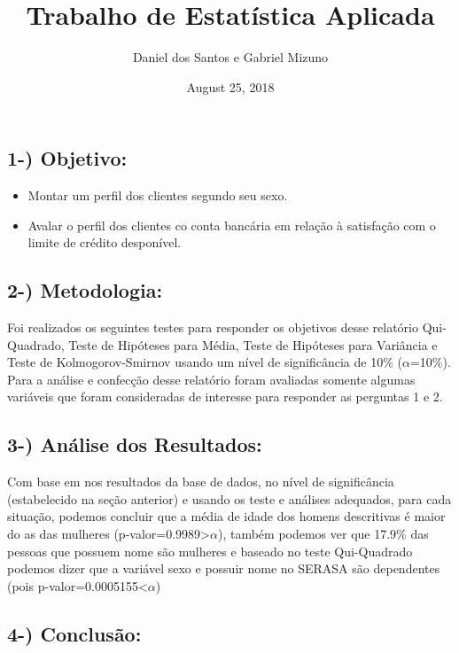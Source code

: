 \documentclass[]{article}
\title{Trabalho de Estatística Aplicada}
\author{Daniel dos Santos e Gabriel Mizuno}
\date{August 25, 2018}
\providecommand{\tightlist}{%
  \setlength{\itemsep}{0pt}\setlength{\parskip}{0pt}}
\begin{document}
\maketitle

{
\setcounter{tocdepth}{1}
\tableofcontents
}
\subsection{1-) Objetivo:}\label{objetivo}

\begin{itemize}
\tightlist
\item
  Montar um perfil dos clientes segundo seu sexo.\\
\item
  Avalar o perfil dos clientes co conta bancária em relação à satisfação
  com o limite de crédito desponível.
\end{itemize}

\subsection{2-) Metodologia:}\label{metodologia}

Foi realizados os seguintes testes para responder os objetivos desse
relatório Qui-Quadrado, Teste de Hipóteses para Média, Teste de
Hipóteses para Variância e Teste de Kolmogorov-Smirnov usando um nível
de significância de 10\% (\(\alpha\)=10\%). Para a análise e confecção
desse relatório foram avaliadas somente algumas variáveis que foram
consideradas de interesse para responder as perguntas 1 e 2.

\subsection{3-) Análise dos Resultados:}\label{analise-dos-resultados}

Com base em nos resultados da base de dados, no nível de significância
(estabelecido na seção anterior) e usando os teste e análises adequados,
para cada situação, podemos concluir que a média de idade dos homens
descritivas é maior do as das mulheres
(p-valor=0.9989\textgreater{}\(\alpha\)), também podemos ver que 17.9\%
das pessoas que possuem nome são mulheres e baseado no teste
Qui-Quadrado podemos dizer que a variável sexo e possuir nome no SERASA
são dependentes (pois p-valor=0.0005155\textless{}\(\alpha\))

\subsection{4-) Conclusão:}\label{conclusao}
\end{document}
